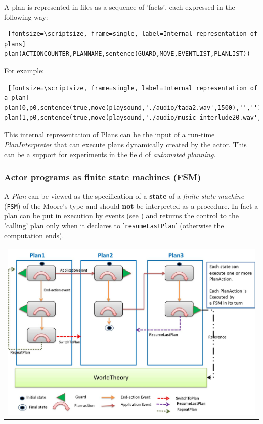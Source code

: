 A plan is represented in files as a sequence of 'facts', each expressed in the following way:
\begin{Verbatim} [fontsize=\scriptsize, frame=single, label=Internal representation of plans]		
plan(ACTIONCOUNTER,PLANNAME,sentence(GUARD,MOVE,EVENTLIST,PLANLIST))
\end{Verbatim} 
For example:

\begin{Verbatim} [fontsize=\scriptsize, frame=single, label=Internal representation of a plan]		
plan(0,p0,sentence(true,move(playsound,'./audio/tada2.wav',1500),'',''))
plan(1,p0,sentence(true,move(playsound,'./audio/music_interlude20.wav',20000),'usercmd,alarm','handleUsercmd,handleAlarm'))
\end{Verbatim} 

This internal representation of Plans can be the input of a run-time \textit{PlanInterpreter} that can execute plans dynamically created by the actor. This can be a support for experiments in the field of \textit{automated planning}.

\subsubsection{Actor programs as finite state machines (FSM)}

A \textit{Plan} can be viewed as the specification of a \textbf{state} of a \textit{finite state machine} (\texttt{FSM}) of the Moore's type  and should \textbf{not} be interpreted as a procedure. In fact a plan can be put in execution by events (see ) and returns the control to the 'calling' plan only when it declares to '\texttt{resumeLastPlan}' (otherwise the computation ends). 

\begin{center}
\begin{tabular}{ c }
     \includegraphics[scale = 0.55]{img/planFSM.jpg}\\
\end{tabular}{   }
\end{center}

